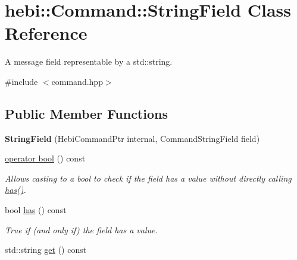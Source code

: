 \hypertarget{classhebi_1_1Command_1_1StringField}{}\section{hebi\+:\+:Command\+:\+:String\+Field Class Reference}
\label{classhebi_1_1Command_1_1StringField}


A message field representable by a std\+::string.  




{\ttfamily \#include $<$command.\+hpp$>$}

\subsection*{Public Member Functions}
\begin{DoxyCompactItemize}
\item 
{\bfseries String\+Field} (Hebi\+Command\+Ptr internal, Command\+String\+Field field)\hypertarget{classhebi_1_1Command_1_1StringField_ae7b2fffca27317a938a0915f1c184832}{}\label{classhebi_1_1Command_1_1StringField_ae7b2fffca27317a938a0915f1c184832}

\item 
\hyperlink{classhebi_1_1Command_1_1StringField_a2ddd1c306a4c8c251002e25912396c23}{operator bool} () const 
\begin{DoxyCompactList}\small\item\em Allows casting to a bool to check if the field has a value without directly calling {\ttfamily \hyperlink{classhebi_1_1Command_1_1StringField_a41f4d911e4445fc246c185a8b81b3788}{has()}}. \end{DoxyCompactList}\item 
bool \hyperlink{classhebi_1_1Command_1_1StringField_a41f4d911e4445fc246c185a8b81b3788}{has} () const \hypertarget{classhebi_1_1Command_1_1StringField_a41f4d911e4445fc246c185a8b81b3788}{}\label{classhebi_1_1Command_1_1StringField_a41f4d911e4445fc246c185a8b81b3788}

\begin{DoxyCompactList}\small\item\em True if (and only if) the field has a value. \end{DoxyCompactList}\item 
std\+::string \hyperlink{classhebi_1_1Command_1_1StringField_a266b877cd0b814a51585e42582a450f5}{get} () const \hypertarget{classhebi_1_1Command_1_1StringField_a266b877cd0b814a51585e42582a450f5}{}\label{classhebi_1_1Command_1_1StringField_a266b877cd0b814a51585e42582a450f5}


\end{DoxyCompactItemize}
